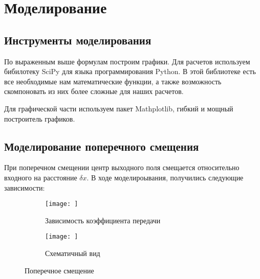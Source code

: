 \chapter{Моделирование}
\section{Инструменты моделирования}

По выраженным выше формулам построим графики. Для расчетов используем бибилотеку SciPy для языка программирования Python. В этой библиотеке есть все необходимые нам математические функции, а также возможность скомпоновать из них более сложные для наших расчетов.

Для графической части используем пакет Mathplotlib, гибкий и мощный построитель графиков. 

\section{Моделирование поперечного смещения}

При поперечном смещении центр выходного поля смещается относительно входного на расстояние $\delta x$. В ходе моделироывания, получились следующие зависимости:

\begin{figure}[ht!]
	\begin{subfigure}{.48\textwidth}
		\texttt{[image: ]}
		\caption{Зависимость коэффициента передачи}
	\end{subfigure}
	\hfill
	\begin{subfigure}{.48\textwidth}
		\texttt{[image: ]}
		\caption{Схематичный вид}
	\end{subfigure}
	\caption{Поперечное смещение}
\end{figure}